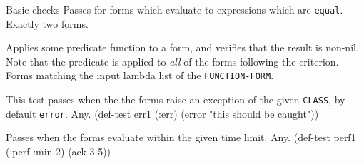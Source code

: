 \begin{criteriaGroup}{Basic checks}{}
{Passes for forms which evaluate to expressions which are
\texttt{equal}.}
{Exactly two forms.}
{\noExpl}
{\noEx}{}

{Applies some predicate function to a form, and verifies that the
result is non-nil.  Note that the predicate is applied to \emph{all}
of the forms following the criterion.}
{Forms matching the input lambda list of the \texttt{FUNCTION-FORM}.}
{\noExpl}
{\multiEx}
{
 }

{This test passes when the the forms raise an exception of the given
\texttt{CLASS}, by default \texttt{error}.}
{Any.}
{\noExpl}
{\singleEx}{(def-test err1 (:err) (error "this should be caught"))}

{Passes when the forms evaluate within the given time limit.}
{Any.}
{\noExpl}
{\singleEx}{(def-test perf1 (:perf :min 2) (ack 3 5))}

\end{criteriaGroup}

